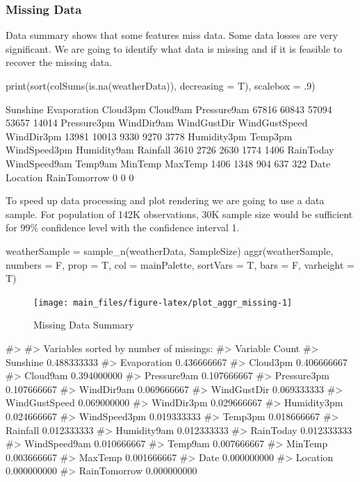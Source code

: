 \hypertarget{missing-data}{%
\subsubsection{Missing Data}\label{missing-data}}

Data summary shows that some features miss data. Some data losses are
very significant. We are going to identify what data is missing and if
it is feasible to recover the missing data.

\begin{Sinput}
print(sort(colSums(is.na(weatherData)), decreasing = T), scalebox = .9)
\end{Sinput}

Sunshine Evaporation Cloud3pm Cloud9am Pressure9am 67816 60843 57094
53657 14014 Pressure3pm WindDir9am WindGustDir WindGustSpeed WindDir3pm
13981 10013 9330 9270 3778 Humidity3pm Temp3pm WindSpeed3pm Humidity9am
Rainfall 3610 2726 2630 1774 1406 RainToday WindSpeed9am Temp9am MinTemp
MaxTemp 1406 1348 904 637 322 Date Location RainTomorrow 0 0 0

To speed up data processing and plot rendering we are going to use a
data sample. For population of 142K observations, 30K sample size would
be sufficient for 99\% confidence level with the confidence interval 1.

\begin{Schunk}
\begin{Sinput}
weatherSample = sample_n(weatherData, SampleSize)
aggr(weatherSample, numbers = F, prop = T, col = mainPalette, sortVars = T, bars = F, varheight = T)
\end{Sinput}
\begin{figure}[H]

{\centering \texttt{[image: main\_files/figure-latex/plot\_aggr\_missing-1]} 

}

\caption[Missing Data Summary]{Missing Data Summary}\label{fig:plot_aggr_missing}
\end{figure}
\begin{Soutput}
#> 
#>  Variables sorted by number of missings: 
#>       Variable       Count
#>       Sunshine 0.488333333
#>    Evaporation 0.436666667
#>       Cloud3pm 0.406666667
#>       Cloud9am 0.394000000
#>    Pressure9am 0.107666667
#>    Pressure3pm 0.107666667
#>     WindDir9am 0.069666667
#>    WindGustDir 0.069333333
#>  WindGustSpeed 0.069000000
#>     WindDir3pm 0.029666667
#>    Humidity3pm 0.024666667
#>   WindSpeed3pm 0.019333333
#>        Temp3pm 0.018666667
#>       Rainfall 0.012333333
#>    Humidity9am 0.012333333
#>      RainToday 0.012333333
#>   WindSpeed9am 0.010666667
#>        Temp9am 0.007666667
#>        MinTemp 0.003666667
#>        MaxTemp 0.001666667
#>           Date 0.000000000
#>       Location 0.000000000
#>   RainTomorrow 0.000000000
\end{Soutput}
\end{Schunk}


